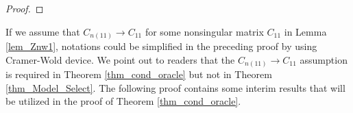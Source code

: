 \documentclass[ejs,authoryear,linksfromyear]{imsart}
\newcommand{\sumin}{\sum_{i=1}^n} %
\newcommand{\CONV}[1]{\stackrel{\text{#1}}{\longrightarrow}} %
\newcommand{\znwa}{\bm{Z}_{n(1)}^w}
\numberwithin{equation}{section}
\theoremstyle{plain}
\begin{document}
\begin{proof}
\end{proof}

If we assume that $C_{n(11)} \to C_{11}$ for some nonsingular matrix $C_{11}$ in Lemma \ref{lem_Znw1}, notations could be simplified in the preceding proof by using Cramer-Wold device. We point out to readers that the $C_{n(11)} \to C_{11}$ assumption is required in Theorem \ref{thm_cond_oracle} but not in Theorem \ref{thm_Model_Select}. The following proof contains some interim results that will be utilized in the proof of Theorem \ref{thm_cond_oracle}. 
\end{document}
